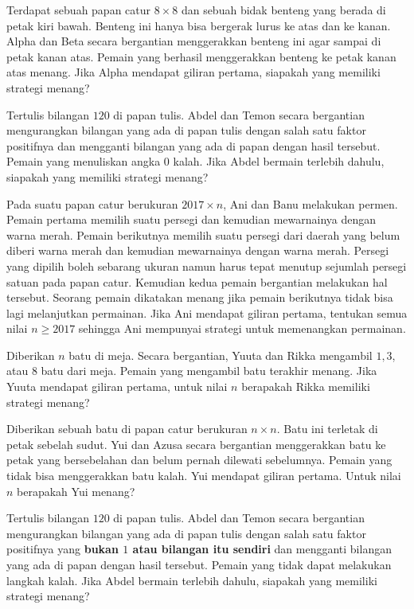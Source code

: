 \documentclass[11pt]{scrartcl}
\begin{document}
\begin{problem}
Terdapat sebuah papan catur $8 \times 8$ dan sebuah bidak benteng yang berada di petak kiri bawah. Benteng ini hanya bisa bergerak lurus ke atas dan ke kanan. Alpha dan Beta secara bergantian menggerakkan benteng ini agar sampai di petak kanan atas. Pemain yang berhasil menggerakkan benteng ke petak kanan atas menang. Jika Alpha mendapat giliran pertama, siapakah yang memiliki strategi menang?
\end{problem}

\begin{problem}
Tertulis bilangan $120$ di papan tulis. Abdel dan Temon secara bergantian mengurangkan bilangan yang ada di papan tulis dengan salah satu faktor positifnya dan mengganti bilangan yang ada di papan dengan hasil tersebut. Pemain yang menuliskan angka $0$ kalah. Jika Abdel bermain terlebih dahulu, siapakah yang memiliki strategi menang?
\end{problem}

\begin{problem}[OSP 2017]
Pada suatu papan catur berukuran $2017 \times n$, Ani dan Banu melakukan permen. Pemain pertama memilih suatu persegi dan kemudian mewarnainya dengan warna merah. Pemain berikutnya memilih suatu persegi dari daerah yang belum diberi warna merah dan kemudian mewarnainya dengan warna merah. Persegi yang dipilih boleh sebarang ukuran namun harus tepat menutup sejumlah persegi satuan pada papan catur. Kemudian kedua pemain bergantian melakukan hal tersebut. Seorang pemain dikatakan menang jika pemain berikutnya tidak bisa lagi melanjutkan permainan. Jika Ani mendapat giliran pertama, tentukan semua nilai $n \geq 2017$ sehingga Ani mempunyai strategi untuk memenangkan permainan.
\end{problem}

\begin{problem}
Diberikan $n$ batu di meja. Secara bergantian, Yuuta dan Rikka mengambil $1, 3$, atau $8$ batu dari meja. Pemain yang mengambil batu terakhir menang. Jika Yuuta mendapat giliran pertama, untuk nilai $n$ berapakah Rikka memiliki strategi menang?
\end{problem}

\begin{problem}
Diberikan sebuah batu di papan catur berukuran $n \times n$. Batu ini terletak di petak sebelah sudut. Yui dan Azusa secara bergantian menggerakkan batu ke petak yang bersebelahan dan belum pernah dilewati sebelumnya. Pemain yang tidak bisa menggerakkan batu kalah. Yui mendapat giliran pertama. Untuk nilai $n$ berapakah Yui menang?
\end{problem}

\begin{problem}
Tertulis bilangan $120$ di papan tulis. Abdel dan Temon secara bergantian mengurangkan bilangan yang ada di papan tulis dengan salah satu faktor positifnya yang \textbf{bukan $1$ atau bilangan itu sendiri} dan mengganti bilangan yang ada di papan dengan hasil tersebut. Pemain yang tidak dapat melakukan langkah kalah. Jika Abdel bermain terlebih dahulu, siapakah yang memiliki strategi menang?
\end{problem}
\end{document}
